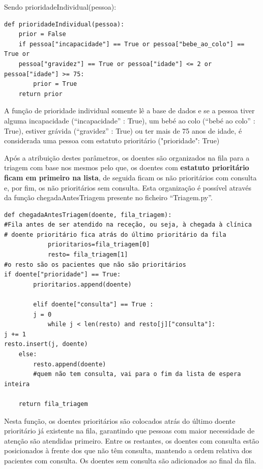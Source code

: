 \documentclass[12pt,a4paper]{article} %
\begin{document}
    Sendo prioridadeIndividual(pessoa): 

 \begin{verbatim}
def prioridadeIndividual(pessoa):
    prior = False
    if pessoa["incapacidade"] == True or pessoa["bebe_ao_colo"] == True or 
    pessoa["gravidez"] == True or pessoa["idade"] <= 2 or pessoa["idade"] >= 75:
        prior = True
    return prior    
 \end{verbatim}

     A função de prioridade individual somente lê a base de dados e se a pessoa tiver alguma incapacidade (“incapacidade” : True), um bebé ao colo (“bebé ao colo” : True), estiver grávida (“gravidez” : True) ou ter mais de 75 anos de idade, é considerada uma pessoa com estatuto prioritário ("prioridade": True) 

    \medskip
	Após a atribuição destes parâmetros, os doentes são organizados na fila para a triagem com base nos mesmos pelo que, os doentes com \textbf{estatuto prioritário ficam em primeiro na lista}, de seguida ficam os não prioritários com consulta e, por fim, os não prioritários sem consulta. Esta organização é possível através da função chegadaAntesTriagem presente no ficheiro “Triagem.py”.

\begin{verbatim}
def chegadaAntesTriagem(doente, fila_triagem):  
#Fila antes de ser atendido na receção, ou seja, à chegada à clínica
# doente prioritário fica atrás do último prioritário da fila
    		prioritarios=fila_triagem[0]
    		resto= fila_triagem[1] 
#o resto são os pacientes que não são prioritários
if doente["prioridade"] == True:
        prioritarios.append(doente)
           
    	elif doente["consulta"] == True :
      	j = 0                                                                            
        	while j < len(resto) and resto[j]["consulta"]:
j += 1	
resto.insert(j, doente)
    else:
        resto.append(doente)  
        #quem não tem consulta, vai para o fim da lista de espera inteira
   
    return fila_triagem
\end{verbatim}

    Nesta função, os doentes prioritários são colocados atrás do último doente prioritário já existente na fila, garantindo que pessoas com maior necessidade de atenção são atendidas primeiro. Entre os restantes, os doentes com consulta estão posicionados à frente dos que não têm consulta, mantendo a ordem relativa dos pacientes com consulta. Os doentes sem consulta são adicionados ao final da fila.
    
\end{document}

